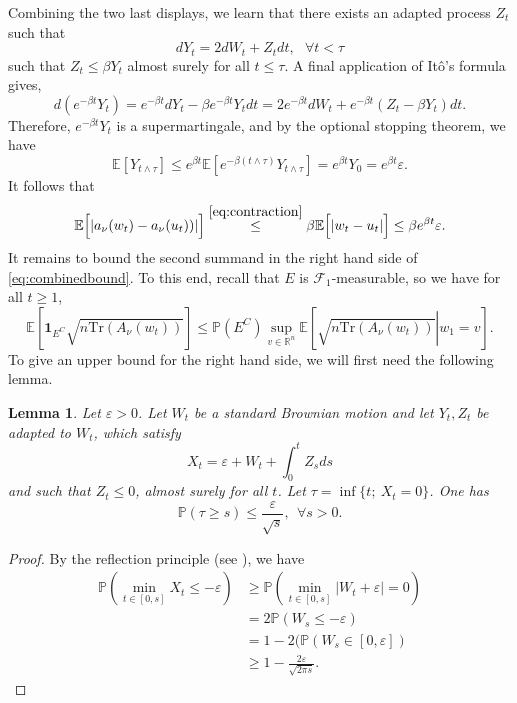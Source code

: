 \documentclass[12pt]{article}
\def \RR {\mathbb R}
\def \EE {\mathbb E}
\def \PP {\mathbb P}
\def \eps {\varepsilon}
\def \FF {\mathcal{F}}
\newtheorem{lemma}[theorem]{Lemma}
\theoremstyle{definition}
\theoremstyle{remark}
\begin{document}
Combining the two last displays, we learn that there exists an adapted process $Z_t$ such that
\begin{equation}\label{eq:dYt}
d Y_t = 2 d W_t + Z_t dt, ~~~ \forall t < \tau
\end{equation}
such that $Z_t \leq \beta Y_t$ almost surely for all $t \leq \tau$. A final application of It\^o's formula gives,
\begin{equation}\label{eq:ItoEy}
d (e^{-\beta t} Y_t) = e^{-\beta t} d Y_t - \beta e^{-\beta t} Y_t dt = 2 e^{- \beta t} d W_t + e^{- \beta t} (Z_t - \beta Y_t) dt.
\end{equation}
Therefore, $e^{-\beta t} Y_t$ is a supermartingale, and by the optional stopping theorem, we have
$$
\EE \left [Y_{t \wedge \tau} \right ] \leq e^{\beta t} \EE \left [e^{-\beta (t \wedge \tau)} Y_{t \wedge \tau} \right ] = e^{\beta t} Y_0 = e^{\beta t} \eps.
$$
It follows that
\begin{equation}\label{eq:firstterm}
\EE \Bigl [ | a_\nu(w_t) - a_\nu(u_t))|\Bigr ] \stackrel{\eqref{eq:contraction} }{\leq} \beta \EE \Bigl [ | w_t - u_t |\Bigr ] \leq \beta e^{\beta t} \eps.
\end{equation}
It remains to bound the second summand in the right hand side of \eqref{eq:combinedbound}. To this end, recall that $E$ is $\FF_1$-measurable, so we have for all $t \geq 1$,
\begin{equation}\label{eq:condtime1}
\EE \left [ \mathbf{1}_{E^C} \sqrt{n\mathrm{Tr}(A_\nu(w_t))} \right ] \leq \PP \left ( E^C \right ) \sup_{v \in \RR^n} \EE \left . \left [ \sqrt{n\mathrm{Tr}(A_\nu(w_t))} \right | w_1 = v \right ]. 
\end{equation}
To give an upper bound for the right hand side, we will first need the following lemma.
\begin{lemma}
Let $\eps > 0$. Let $W_t$ be a standard Brownian motion and let $Y_t, Z_t$ be adapted to $W_t$, which satisfy
$$
X_t = \eps + W_t + \int_0^t Z_s ds
$$
and such that $Z_t \leq 0$, almost surely for all $t$. Let $\tau = \inf\{t; ~ X_t = 0 \}$. One has
$$
\PP(\tau \geq s) \leq \frac{\eps}{\sqrt{s}}, ~~ \forall s > 0.
$$
\end{lemma}
\begin{proof}
By the reflection principle (see \cite[Theorem 2.19]{PM-BM}), we have 
\begin{align*}
\PP \left ( \min_{t \in [0,s] } X_t \leq - \eps \right ) & \geq \PP \left ( \min_{t \in [0,s] } |W_t + \eps| = 0 \right ) \\
 & = 2 \PP( W_s \leq - \eps ) \\
& = 1 - 2 (\PP( W_s \in [0, \eps] )  \\
& \geq 1 - \frac{2 \eps}{\sqrt{2 \pi s}}.
\end{align*}
\end{proof}
\end{document}
